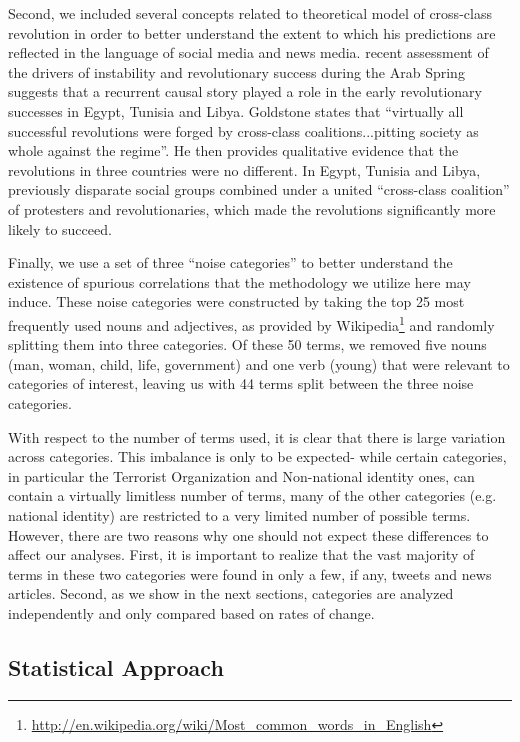 Second, we included several concepts related to  theoretical model of cross-class revolution in order to better understand the extent to which his predictions are reflected in the language of social media and news media.   recent assessment of the drivers of instability and revolutionary success during the Arab Spring suggests that a recurrent causal story played a role in the early revolutionary successes in Egypt, Tunisia and Libya.  Goldstone states that ``virtually all successful revolutions were forged by cross-class coalitions...pitting society as whole against the regime''. He then provides qualitative evidence that the revolutions in three countries were no different.  In Egypt, Tunisia and Libya, previously disparate social groups combined under a united ``cross-class coalition'' of protesters and revolutionaries, which made the revolutions significantly more likely to succeed.

Finally, we use a set of three ``noise categories'' to better understand the existence of spurious correlations that the methodology we utilize here may induce.  These noise categories were constructed by taking the top 25 most frequently used nouns and adjectives, as provided by Wikipedia\footnote{\url{http://en.wikipedia.org/wiki/Most_common_words_in_English}} and randomly splitting them into three categories.  Of these 50 terms, we removed five nouns (man, woman, child, life, government) and one verb (young) that were relevant to categories of interest, leaving us with 44 terms split between the three noise categories.

With respect to the number of terms used, it is clear that there is large variation across categories.  This imbalance is only to be expected- while certain categories, in particular the Terrorist Organization and Non-national identity ones, can contain a virtually limitless number of terms, many of the other categories (e.g. national identity) are restricted to a very limited number of possible terms.  However, there are two reasons why one should not expect these differences to affect our analyses. First, it is important to realize that the vast majority of terms in these two categories were found in only a few, if any, tweets and news articles. Second, as we show in the next sections, categories are analyzed independently and only compared based on rates of change.

\subsection{Statistical Approach}

